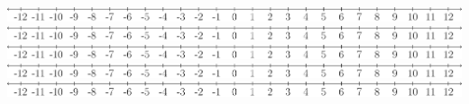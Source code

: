 \documentclass[english,hidelinks,pdftex, 11 pt, class=article,crop=false]{standalone}
\begin{document}

\includegraphics[angle=90]{tallinje} \qquad \qquad \qquad
\includegraphics[angle=90]{tallinje} \qquad \qquad \qquad
\includegraphics[angle=90]{tallinje} \qquad \qquad \qquad
\includegraphics[angle=90]{tallinje} \qquad \qquad \qquad
\includegraphics[angle=90]{tallinje}
\end{document}
